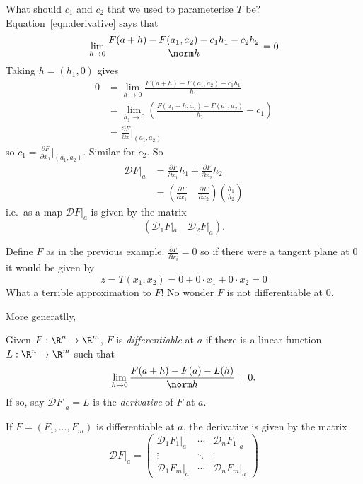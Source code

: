\documentclass[a4paper]{article}
\newcommand*{\D}{\mathcal{D}}
\theoremstyle{definition}
\begin{document}
What should \(c_1\) and \(c_2\) that we used to parameterise \(T\) be? Equation~\eqref{eqn:derivative} says that
\[
  \lim_{h \to 0} \frac{F(a + h) - F(a_1, a_2) - c_1h_1 - c_2h_2}{\norm h} = 0
\]
Taking \(h = (h_1, 0)\) gives
\begin{align*}
  0 &= \lim_{h \to 0} \frac{F(a + h) - F(a_1, a_2) - c_1h_1}{h_1} \\
    &= \lim_{h_1 \to 0} \left( \frac{F(a_1 + h, a_2) - F(a_1, a_2)}{h_1} - c_1 \right) \\
    &= \frac{\partial F}{\partial x} \Big|_{(a_1, a_2)}
\end{align*}
so \(c_1 = \frac{\partial F}{\partial x_1}|_{(a_1, a_2)}\). Similar for \(c_2\). So
\begin{align*}
    \D F|_a &= \frac{\partial F}{\partial x_1} h_1 + \frac{\partial F}{\partial x_2} h_2 \\
            &= \left( \frac{\partial F}{\partial x_1} \quad \frac{\partial F}{\partial x_2} \right) \binom{h_1}{h_2}
\end{align*}
i.e.\ as a map \(\D F|_a\) is given by the matrix
\[
  (\D_1 F|_a \quad \D_2 F|_a ).
\]

\begin{eg}
  Define \(F\) as in the previous example. \(\frac{\partial F}{\partial x_i} = 0\) so if there were a tangent plane at 0 it would be given by
  \[
    z = T(x_1, x_2) = 0 + 0 \cdot x_1 + 0 \cdot x_2 = 0
  \]
  What a terrible approximation to \(F\)! No wonder \(F\) is not differentiable at \(0\).
\end{eg}

More generatlly,

\begin{definition}[Differentiability]
  Given \(F: \R^n \to \R^m\), \(F\) is \emph{differentiable} at \(a\) if there is a linear function \(L: \R^n \to \R^m\) such that
  \[
    \lim_{h \to 0} \frac{F(a + h) - F(a) - L(h)}{\norm h} = 0.
  \]
  If so, say \(\D F|_a = L\) is the \emph{derivative} of \(F\) at \(a\).
\end{definition}

If \(F = (F_1, \dots, F_m)\) is differentiable at \(a\), the derivative is given by the matrix
\[
  \D F|_a =
  \begin{pmatrix}
    \D_1F_1|_a & \cdots & \D_nF_1|_a \\
    \vdots & \ddots & \vdots \\
    \D_1F_m|_a & \cdots & \D_nF_m|_a
  \end{pmatrix}
\]
  
\end{document}

